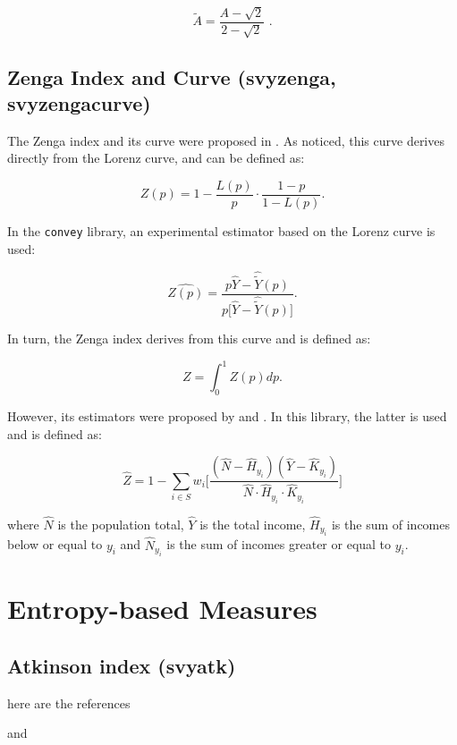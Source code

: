 \documentclass[]{book}
\begin{document}
\[
\widetilde{A} = \frac{ A - \sqrt{2} }{2 - \sqrt{2} } \text{ .}
\]

\subsection{Zenga Index and Curve (svyzenga,
svyzengacurve)}\label{zenga-index-and-curve-svyzenga-svyzengacurve}

The Zenga index and its curve were proposed in \citep{zenga2007}. As
\citep{polisicchio2011} noticed, this curve derives directly from the
Lorenz curve, and can be defined as:

\[
Z(p) = 1 - \frac{L(p)}{p} \cdot \frac{1 - p}{1 - L(p)}.
\]

In the \texttt{convey} library, an experimental estimator based on the
Lorenz curve is used:

\[
\widehat{Z(p)} = \frac{ p \widehat{Y} - \widehat{\widetilde{Y}}(p) }{p \big[ \widehat{Y} - \widehat{\widetilde{Y}}(p) \big] }.
\]

In turn, the Zenga index derives from this curve and is defined as:

\[
Z = \int_0^1 Z(p)dp.
\]

However, its estimators were proposed by \citep{langel2012} and
\citep{barabesi2016}. In this library, the latter is used and is defined
as:

\[
\widehat{Z} = 1 - \sum_{i \in S} w_i \bigg[ \frac{ ( \widehat{N} - \widehat{H}_{y_i} ) ( \widehat{Y} -\widehat{K}_{y_i} ) }
{ \widehat{N} \cdot \widehat{H}_{y_i} \cdot \widehat{K}_{y_i} } \bigg]
\]

where \(\widehat{N}\) is the population total, \(\widehat{Y}\) is the
total income, \(\widehat{H}_{y_i}\) is the sum of incomes below or equal
to \(y_i\) and \(\widehat{N}_{y_i}\) is the sum of incomes greater or
equal to \(y_i\).

\section{Entropy-based Measures}\label{entropy-based-measures}

\subsection{Atkinson index (svyatk)}\label{atkinson-index-svyatk}

here are the references

\citep{langel2012} and \citep{biewen2003}
\end{document}
